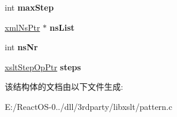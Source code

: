 \begin{DoxyCompactItemize}
int {\bfseries max\+Step}
\item 
\mbox{\label{struct__xslt_comp_match_a0416808f8b81911d408454e8ac76044d}} 
\hyperlink{struct__xml_ns}{xml\+Ns\+Ptr} $\ast$ {\bfseries ns\+List}
\item 
\mbox{\label{struct__xslt_comp_match_aa73af4321cf01f37863f43bc1cf1e8d1}} 
int {\bfseries ns\+Nr}
\item 
\mbox{\label{struct__xslt_comp_match_a7c72b7516f1e445155d9df62bcc64951}} 
\hyperlink{struct__xslt_step_op}{xslt\+Step\+Op\+Ptr} {\bfseries steps}
\end{DoxyCompactItemize}


该结构体的文档由以下文件生成\+:\begin{DoxyCompactItemize}
\item 
E\+:/\+React\+O\+S-\/0../dll/3rdparty/libxslt/pattern.\+c\end{DoxyCompactItemize}
